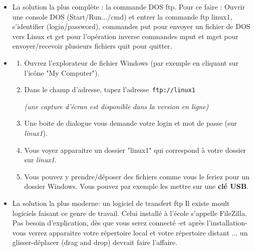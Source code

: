 \documentclass[11pt,a4paper]{article}
\begin{document}
					\begin{itemize}
				
			\item 
            La solution la plus compl\`ete : la commande DOS ftp.
            Pour ce faire :
            Ouvrir une console DOS (Start/Run.../cmd) et entrer la commande ftp linux1,
            s'identifier (login/password),
            commandes put pour envoyer un fichier de DOS vers Linux et get pour l'op\'eration inverse
            commandes mput et mget pour envoyer/recevoir plusieurs fichiers 
            quit pour quitter.
          
			\item 
					\begin{enumerate}
				
			\item Ouvrez l'explorateur de fichier Windows (par exemple en cliquant sur l'ic\^one "My Computer").
			\item 
                Dans le champ d'adresse, tapez l'adresse \,\verb|ftp://linux1|\,\par
				 {\footnotesize\emph{(une capture d'\'ecran est disponible dans la version en ligne)}\par} 
			\item Une boite de dialogue vous demande votre login et mot de passe (sur \textit{linux1}).
			\item Vous voyez apparaitre un dossier "linux1" qui correspond \`a votre dossier sur \textit{linux1}. 
			\item 
                Vous pouvez y prendre/d\'eposer des fichiers comme vous le feriez pour un dossier Windows. 
                Vous pouvez par exemple les mettre sur une \textbf{cl\'e USB}.
              
					\end{enumerate}
				
			\item 
            La solution la plus moderne: un logiciel de transfert ftp
            Il existe moult logiciels faisant ce genre de travail. Celui install\'e \`a l'\'ecole s'appelle FileZilla. Pas besoin d'explication, 
            d\`es que vous serez connect\'e -et apr\`es l'installation-  vous verrez apparaitre votre r\'epertoire local et votre r\'epertoire distant ... 
            un glisser-d\'eplacer (drag and drop) devrait faire l'affaire. 
          
					\end{itemize}
				
            \par
          
\end{document}
